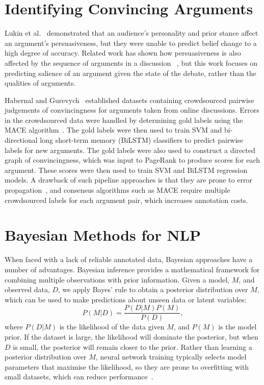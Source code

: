 \section{Identifying Convincing Arguments}\label{sec:related}

Lukin et al.~ demonstrated that an audience's personality and prior stance affect
an argument's persuasiveness, but they were unable to predict belief change to a high degree of accuracy.
Related work has shown how persuasiveness is also affected by the sequence of arguments in a discussion 
~\cite{tan2016winning,rosenfeld2016providing,monteserin2013reinforcement},
but this work focuses on predicting salience of an argument given the state of the debate,
 rather than the qualities of arguments.

Habernal and Gurevych~ established datasets
containing crowdsourced pairwise judgements of convincingness for arguments taken from online discussions. 
Errors in the crowdsourced data were handled by determining gold labels using the MACE algorithm~\cite{hovy2013learning}.
The gold labels were then used to train SVM and bi-directional long short-term memory (BiLSTM) classifiers to predict pairwise
labels for new arguments. 
The gold labels were also used to construct a directed graph of convincingness, which was input to PageRank 
to produce scores for each argument. 
These scores were then used to train SVM and BiLSTM regression models.
A drawback of such pipeline approaches is that they are prone to error propagation~\cite{chen2016joint},
and consensus algorithms such as MACE require multiple crowdsourced labels for each argument pair, 
which increases annotation costs.

\section{Bayesian Methods for NLP}\label{sec:bayesian}

When faced with a lack of reliable annotated data, 
Bayesian approaches have a number of advantages.
Bayesian inference provides a mathematical framework for combining multiple observations
with prior information. 
Given a model, $M$, and observed data, $D$, we apply Bayes' rule
to obtain a posterior distribution over $M$, which can be used to make predictions 
about unseen data or latent variables:
\begin{equation}
  P(M|D) = \frac{P(D|M)P(M)}{P(D)},
  \label{eq:bayesrule}
\end{equation}
where $P(D|M)$ is the likelihood of the data given $M$, and $P(M)$ is the model prior.
If the dataset is large, the likelihood will dominate the posterior,
but when $D$ is small, the posterior will remain closer to the prior.
Rather than learning a posterior distribution over $M$,
neural network training typically selects model parameters that maximise the likelihood, 
so they are prone to overfitting with small datasets, which can reduce performance~\cite{xiong2011bayesian}.

